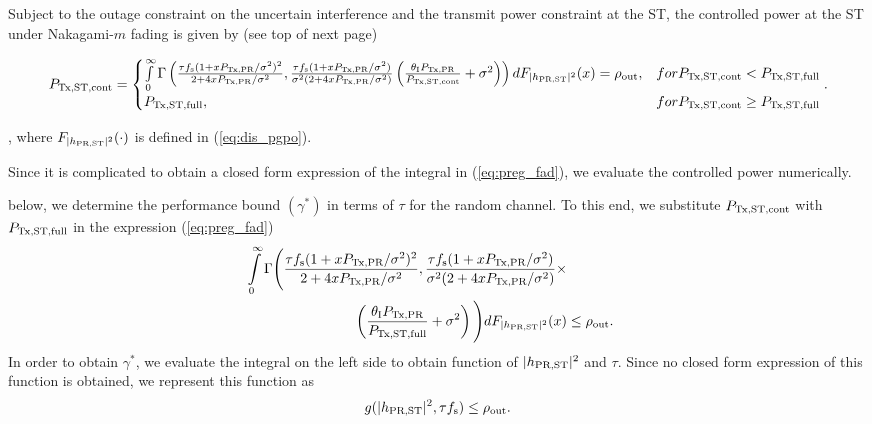\begin{lemma} \label{lm:lm6}
\normalfont
Subject to the outage constraint on the uncertain interference and the transmit power constraint at the ST, the controlled power at the ST under Nakagami-$m$ fading is given by (see top of next page)
\begin{figure}
\begin{align}
\preg &=  
\begin{cases} 
\int\limits_{0}^{\infty} \Gamma\left(\frac{\tau \fsam (1 + x \ptran/\nps)^2}{2 + 4 x \ptran/\nps}, \frac{\tau \fsam (1 + x \ptran/\nps)}{\nps (2 + 4 x \ptran/\nps)} \left(\frac{\ite\ptran}{\preg} + \nps \right)\right) d \fpgpo(x) = \opc, & \mbox{for } \preg < \pc \\
\pc, & \mbox{for } \preg \ge \pc
\end{cases}.
\label{eq:preg_fad} 
\end{align}
\hrulefill
\end{figure}
, where %
$F_{|h_{\text{PR,ST}}|^2}(\cdot)$ is defined in (\ref{eq:dis_pgpo}). 
\end{lemma} 
\begin{IEEEproof}
Since it is complicated to obtain a closed form expression of the integral in (\ref{eq:preg_fad}), we evaluate the controlled power numerically.  
\end{IEEEproof}
 below, we determine the performance bound $(\gamma^*)$ in terms of $\tau$ for the random channel.
To this end, we substitute $P_{\text{Tx,ST,cont}}$ with $P_{\text{Tx,ST,full}}$ in the expression (\ref{eq:preg_fad}) 
\begin{align}
\int\limits_{0}^{\infty} \Gamma\Bigg( \frac{\tau \fsam (1 + x \ptran/\nps)^2}{2 + 4 x \ptran/\nps}, \frac{\tau \fsam (1 + x \ptran/\nps)}{\nps (2 + 4 x \ptran/\nps)} \times \nonumber \\  \left(\frac{\ite\ptran}{\pc} + \nps \right)\Bigg) d \fpgpo(x) &\le \opc. \label{eq:or_fad}
\end{align}
{In order to obtain $\gamma^*$, we evaluate the integral on the left side to obtain function of $|h_{\text{PR,ST}}|^2$ and $\tau$. Since no closed form expression of this function is obtained, we represent this function as}
\begin{align*}
g(|h_{\text{PR,ST}}|^2, \tau f_{\text{s}}) \le \rho_{\text{out}}. \nonumber   
\end{align*}
